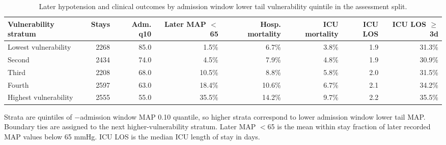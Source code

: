 \begin{table}[!htbp]
\caption{Later hypotension and clinical outcomes by admission window lower tail vulnerability quintile in the assessment split.}
\label{tab:clinical_outcome_strata}
\centering
\begin{tabular}{lrrrrrrr}
\hline
Vulnerability stratum & Stays & Adm. q10 & Later MAP $<$65 & Hosp. mortality & ICU mortality & ICU LOS & ICU LOS $\ge$3d\\
\hline
Lowest vulnerability & 2268 & 85.0 & 1.5\% & 6.7\% & 3.8\% & 1.9 & 31.3\%\\
Second & 2434 & 74.0 & 4.5\% & 7.9\% & 4.8\% & 1.9 & 30.9\%\\
Third & 2208 & 68.0 & 10.5\% & 8.8\% & 5.8\% & 2.0 & 31.5\%\\
Fourth & 2597 & 63.0 & 18.4\% & 10.6\% & 6.7\% & 2.1 & 34.2\%\\
Highest vulnerability & 2555 & 55.0 & 35.5\% & 14.2\% & 9.7\% & 2.2 & 35.5\%\\
\hline
\end{tabular}
\par\smallskip
\footnotesize{Strata are quintiles of $-$admission window MAP 0.10 quantile, so higher strata correspond to lower admission window lower tail MAP. Boundary ties are assigned to the next higher-vulnerability stratum. Later MAP $<$65 is the mean within stay fraction of later recorded MAP values below 65 mmHg. ICU LOS is the median ICU length of stay in days.}
\end{table}
